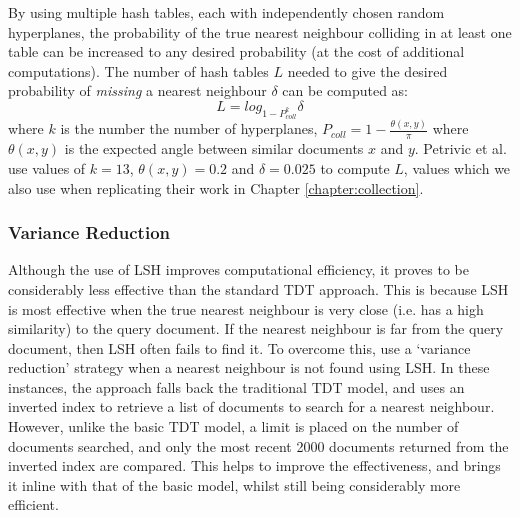By using multiple hash tables, each with independently chosen random hyperplanes, the probability of the true nearest neighbour colliding in at least one table can be increased to any desired probability (at the cost of additional computations).
The number of hash tables $L$ needed to give the desired probability of \emph{missing} a nearest neighbour $\delta$ can be computed as:
\begin{displaymath}
	L = log_{1-P^k_{coll}} \delta
\end{displaymath}
where $k$ is the number the number of hyperplanes, $P_{coll} = 1-\frac{\theta(x,y)}{\pi}$ where $\theta(x,y)$ is the expected angle between similar documents $x$ and $y$.
Petrivic et al. use values of $k = 13$, $\theta(x,y) = 0.2$ and $\delta = 0.025$ to compute $L$, values which we also use when replicating their work in Chapter \ref{chapter:collection}.

\subsubsection{Variance Reduction}
Although the use of LSH improves computational efficiency, it proves to be considerably less effective than the standard TDT approach.
This is because LSH is most effective when the true nearest neighbour is very close (i.e. has a high similarity) to the query document.
If the nearest neighbour is far from the query document, then LSH often fails to find it.
To overcome this, \cite{Petrovic:2010:SFS:1857999.1858020} use a `variance reduction' strategy when a nearest neighbour is not found using LSH.
In these instances, the approach falls back the traditional TDT model, and uses an inverted index to retrieve a list of documents to search for a nearest neighbour.
However, unlike the basic TDT model, a limit is placed on the number of documents searched, and only the most recent 2000 documents returned from the inverted index are compared.
This helps to improve the effectiveness, and brings it inline with that of the basic model, whilst still being considerably more efficient.

